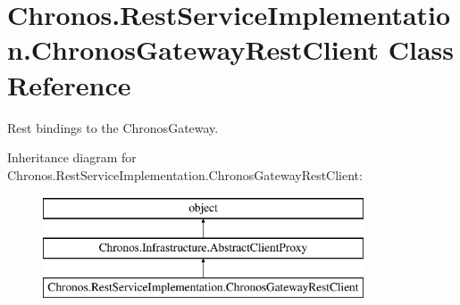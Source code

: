 \hypertarget{classChronos_1_1RestServiceImplementation_1_1ChronosGatewayRestClient}{}\section{Chronos.\+Rest\+Service\+Implementation.\+Chronos\+Gateway\+Rest\+Client Class Reference}
\label{classChronos_1_1RestServiceImplementation_1_1ChronosGatewayRestClient}


Rest bindings to the Chronos\+Gateway.  


Inheritance diagram for Chronos.\+Rest\+Service\+Implementation.\+Chronos\+Gateway\+Rest\+Client\+:\begin{figure}[H]
\begin{center}
\leavevmode
\includegraphics[height=3.000000cm]{classChronos_1_1RestServiceImplementation_1_1ChronosGatewayRestClient}
\end{center}
\end{figure}
